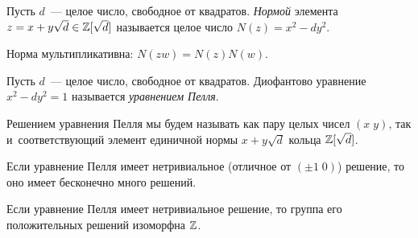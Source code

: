 \documentclass[a4paper, 11pt]{article}
\begin{document}

\def\mtrx#1#2#3#4{\begin{pmatrix}#1 & #2 \\ #3 & #4\end{pmatrix}}
\def\vctr#1#2{(#1\;#2)}

Пусть $d$~--- целое число, свободное от квадратов. \emph{Нормой} элемента $z=x+y\sqrt d\in\mathbb{Z}[\sqrt d]$ называется целое число $N(z)=x^2-dy^2$.




Норма мультипликативна: $N(zw)=N(z)N(w)$.






Пусть $d$~--- целое число, свободное от квадратов. Диофантово уравнение $x^2-dy^2=1$ называется \emph{уравнением Пелля}.

Решением уравнения Пелля мы будем называть как пару целых чисел $\vctr xy$, так и~соответствующий элемент единичной нормы $x+y\sqrt d$ кольца $\mathbb{Z}[\sqrt d]$.




 Если уравнение Пелля имеет нетривиальное (отличное от $\vctr{\pm1}0$) решение, то оно имеет бесконечно много решений.

 Если уравнение Пелля имеет нетривиальное решение, то группа его положительных решений изоморфна $\mathbb{Z}$.
\end{document}
